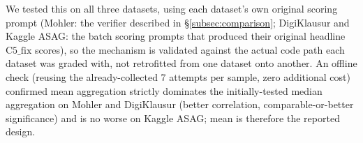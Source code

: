\documentclass[conference]{IEEEtran}
\begin{document}
We tested this on all three datasets, using each dataset's own original
scoring prompt (Mohler: the verifier described in
\S\ref{subsec:comparison}; DigiKlausur and Kaggle ASAG: the batch
scoring prompts that produced their original headline $\text{C5\_fix}$
scores), so the mechanism is validated against the actual code path each
dataset was graded with, not retrofitted from one dataset onto another.
An offline check (reusing the already-collected 7 attempts per sample,
zero additional cost) confirmed mean aggregation strictly dominates the
initially-tested median aggregation on Mohler and DigiKlausur (better
correlation, comparable-or-better significance) and is no worse on
Kaggle ASAG; mean is therefore the reported design.

\begin{table}[t]
\caption{Self-consistency ensembling ($K{=}7$, temperature $=0.7$, mean-aggregated)
         vs.\ the identical-model zero-shot baseline (C\_LLM), all three
         real datasets. Kaggle ASAG uses the deduplicated $n=368$ sample.
         LOOCV columns are leave-one-question-out significant-fold counts.}
\label{tab:selfconsistency}
\centering
\footnotesize
\setlength{\tabcolsep}{4pt}
\end{table}
\end{document}
